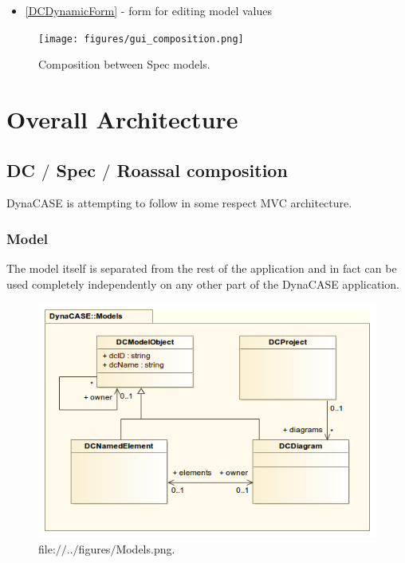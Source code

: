 \documentclass[a4paper,10pt,twoside]{book}
\begin{document}
\begin{itemize}
\item  \ref{DCDynamicForm} - form for editing model values
\end{itemize}


\begin{figure}

\begin{center}
\texttt{[image: figures/gui\_composition.png]}\caption{Composition between Spec models.\label{figures/gui_composition.png}}\end{center}
\end{figure}

\chapter{ Overall Architecture}\section{ DC $/$ Spec $/$ Roassal composition}
DynaCASE is attempting to follow in some respect MVC architecture.
\subsection{ Model}
The model itself is separated from the rest of the application and in fact can be used completely independently on any other part of the DynaCASE application.


\begin{figure}

\begin{center}
\includegraphics[width=1.0\textwidth]{../figures/Models.png}\caption{file:$/$$/$..$/$figures$/$Models.png.\label{../figures/Models.png}}\end{center}
\end{figure}
\end{document}
